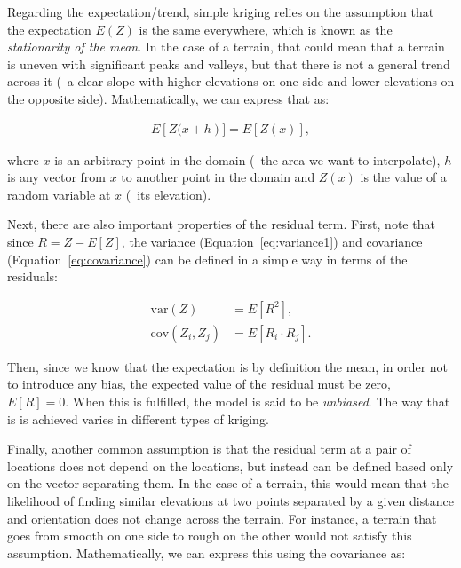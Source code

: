 Regarding the expectation/trend, simple kriging relies on the assumption that the expectation \(E(Z)\) is the same everywhere, which is known as the \emph{stationarity of the mean}.
In the case of a terrain, that could mean that a terrain is uneven with significant peaks and valleys, but that there is not a general trend across it (\eg\ a clear slope with higher elevations on one side and lower elevations on the opposite side).
Mathematically, we can express that as:

\begin{align}
\label{eq:stationarityofthemean}
E\left[Z(x+h\right)] = E\left[Z(x)\right],
\end{align}

where \(x\) is an arbitrary point in the domain (\ie\ the area we want to interpolate), \(h\) is any vector from \(x\) to another point in the domain and \(Z(x)\) is the value of a random variable at \(x\) (\eg\ its elevation).

Next, there are also important properties of the residual term.
First, note that since \(R = Z - E[Z] \), the variance (Equation~\ref{eq:variance1}) and covariance (Equation~\ref{eq:covariance}) can be defined in a simple way in terms of the residuals:

\begin{align}
\mathrm{var}\left(Z\right) &= E\left[{R}^2\right], \label{eq:varres} \\
\mathrm{cov}(Z_i,Z_j) &= E\left[R_i \cdot R_j\right]. \label{eq:covres}
\end{align}

Then, since we know that the expectation is by definition the mean, in order not to introduce any bias, the expected value of the residual must be zero, \ie\ \(E\left[R\right] = 0\).
When this is fulfilled, the model is said to be \emph{unbiased}.
The way that is is achieved varies in different types of kriging.

Finally, another common assumption is that the residual term at a pair of locations does not depend on the locations, but instead can be defined based only on the vector separating them.
In the case of a terrain, this would mean that the likelihood of finding similar elevations at two points separated by a given distance and orientation does not change across the terrain.
For instance, a terrain that goes from smooth on one side to rough on the other would not satisfy this assumption.
Mathematically, we can express this using the covariance as:

